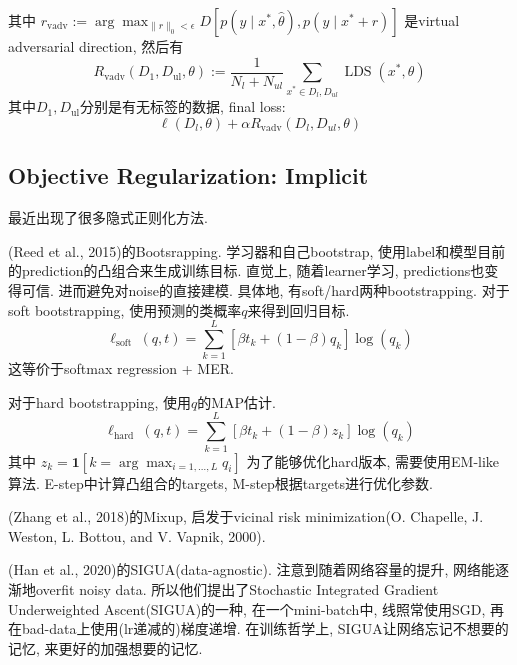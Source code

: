 \documentclass{article}
\begin{document}
其中
$r_{\mathrm{vadv}}:=\arg \max _{\|r\|_{0}<\epsilon} D\left[p\left(y \mid x^{*}, \hat{\theta}\right), p\left(y \mid x^{*}+r\right)\right]$
是virtual adversarial direction, 然后有
\begin{equation}
    R_{\mathrm{vadv}}\left(D_{1}, D_{\mathrm{ul}}, \theta\right):=\frac 1 {N_{l}+N_{u l}} \sum_{x^{*} \in D_{l}, D_{u l}} \operatorname{LDS}\left(x^{*}, \theta\right)
\end{equation}
其中$D_{1}, D_{\mathrm{ul}}$分别是有无标签的数据, final loss:
\begin{equation}
    \ell\left(D_{l}, \theta\right)+\alpha R_{\mathrm{vadv}}\left(D_{l}, D_{u l}, \theta\right)
\end{equation}

\subsection{Objective Regularization: Implicit}

最近出现了很多隐式正则化方法. 

(Reed et al., 2015)的Bootsrapping. 学习器和自己bootstrap, 使用label和模型目前的prediction的凸组合来生成训练目标. 直觉上, 随着learner学习, predictions也变得可信. 进而避免对noise的直接建模. 具体地, 有soft/hard两种bootstrapping. 对于soft bootstrapping, 使用预测的类概率$q$来得到回归目标.
\begin{equation}
    \ell_{\text {soft }}(q, t)=\sum_{k=1}^{L}\left[\beta t_{k}+(1-\beta) q_{k}\right] \log \left(q_{k}\right)
\end{equation}
这等价于softmax regression + MER.

对于hard bootstrapping, 使用$q$的MAP估计.
\begin{equation}
    \ell_{\text {hard }}(q, t)=\sum_{k=1}^{L}\left[\beta t_{k}+(1-\beta) z_{k}\right] \log \left(q_{k}\right)
\end{equation}
其中
$z_{k}=\mathbf{1}\left[k=\arg \max _{i=1, \ldots, L} q_{i}\right]$
为了能够优化hard版本, 需要使用EM-like算法. E-step中计算凸组合的targets, M-step根据targets进行优化参数.

(Zhang et al., 2018)的Mixup, 启发于vicinal risk minimization(O. Chapelle, J. Weston, L. Bottou, and V. Vapnik, 2000).

(Han et al., 2020)的SIGUA(data-agnostic). 注意到随着网络容量的提升, 网络能逐渐地overfit noisy data. 所以他们提出了Stochastic Integrated Gradient Underweighted Ascent(SIGUA)的一种, 在一个mini-batch中, 线照常使用SGD, 再在bad-data上使用(lr递减的)梯度递增. 在训练哲学上, SIGUA让网络忘记不想要的记忆, 来更好的加强想要的记忆.
\end{document}
